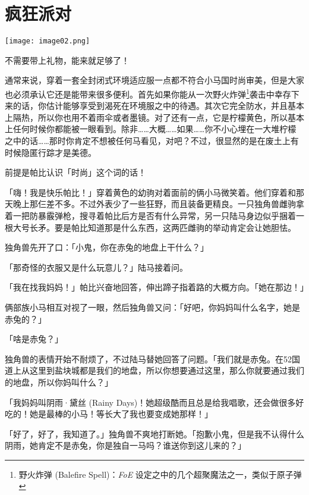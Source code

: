 \chapter{疯狂派对}

\texttt{[image: image02.png]}

\begin{intro}
    不需要带上礼物，能来就足够了！
\end{intro}


通常来说，穿着一套全封闭式环境适应服一点都不符合小马国时尚审美，但是大家也必须承认它还是能带来很多便利。首先如果你能从一次野火炸弹\footnote{野火炸弹 (Balefire Spell)：\emph{FoE} 设定之中的几个超聚魔法之一，类似于原子弹}袭击中幸存下来的话，你估计能够享受到渴死在环境服之中的待遇。其次它完全防水，并且基本上隔热，所以你也用不着雨伞或者墨镜。对了还有一点，它是柠檬黄色，所以基本上任何时候你都能被一眼看到。除非……大概……如果……你不小心埋在一大堆柠檬之中的话……那时你肯定不想被任何马看见，对吧？不过，很显然的是在废土上有时候隐匿行踪才是美德。

前提是帕比认识「时尚」这个词的话！

\horizonline

「嗨！我是快乐帕比！」穿着黄色的幼驹对着面前的俩小马微笑着。他们穿着和那天晚上那仨差不多。不过外表少了一些狂野，而且装备更精良。一只独角兽雌驹拿着一把防暴霰弹枪，搜寻着帕比后方是否有什么异常，另一只陆马身边似乎捆着一根大号长矛。要是帕比知道那是什么东西，这两匹雌驹的举动肯定会让她胆怯。

独角兽先开了口：「小鬼，你在赤兔的地盘上干什么？」

「那奇怪的衣服又是什么玩意儿？」陆马接着问。

「我在找我妈妈！」帕比兴奋地回答，伸出蹄子指着路的大概方向。「她在那边！」

俩部族小马相互对视了一眼，然后独角兽又问：「好吧，你妈妈叫什么名字，她是赤兔的？」

「啥是赤兔？」

独角兽的表情开始不耐烦了，不过陆马替她回答了问题。「我们就是赤兔。在52国道上从这里到盐块城都是我们的地盘，所以你想要通过这里，那么你就要通过我们的地盘，所以你妈叫什么？」

「我妈妈叫阴雨·黛丝 (Rainy Days)！她超级酷而且总是给我唱歌，还会做很多好吃的！她是最棒的小马！等长大了我也要变成她那样！」

「好了，好了，我知道了。」独角兽不爽地打断她。「抱歉小鬼，但是我不认得什么阴雨，她肯定不是赤兔，你是独自一马吗？谁送你到这儿来的？」

